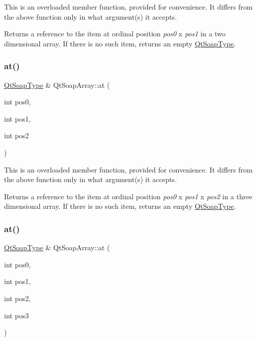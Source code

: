 This is an overloaded member function, provided for convenience. It differs from the above function only in what argument(s) it accepts.

Returns a reference to the item at ordinal position {\itshape pos0} x {\itshape pos1} in a two dimensional array. If there is no such item, returns an empty \mbox{\hyperlink{class_qt_soap_type}{Qt\+Soap\+Type}}. \mbox{\label{class_qt_soap_array_a773a47f952fd917c581740874f6e8c01}} 
\subsubsection{\texorpdfstring{at()}{at()}\hspace{0.1cm}{\footnotesize\ttfamily [3/10]}}
{\footnotesize\ttfamily \mbox{\hyperlink{class_qt_soap_type}{Qt\+Soap\+Type}} \& Qt\+Soap\+Array\+::at (\begin{DoxyParamCaption}\item[{int}]{pos0,  }\item[{int}]{pos1,  }\item[{int}]{pos2 }\end{DoxyParamCaption})}

This is an overloaded member function, provided for convenience. It differs from the above function only in what argument(s) it accepts.

Returns a reference to the item at ordinal position {\itshape pos0} x {\itshape pos1} x {\itshape pos2} in a three dimensional array. If there is no such item, returns an empty \mbox{\hyperlink{class_qt_soap_type}{Qt\+Soap\+Type}}. \mbox{\label{class_qt_soap_array_a3d9b7e09e7c7fdac354b5d8f11a51daa}} 
\subsubsection{\texorpdfstring{at()}{at()}\hspace{0.1cm}{\footnotesize\ttfamily [4/10]}}
{\footnotesize\ttfamily \mbox{\hyperlink{class_qt_soap_type}{Qt\+Soap\+Type}} \& Qt\+Soap\+Array\+::at (\begin{DoxyParamCaption}\item[{int}]{pos0,  }\item[{int}]{pos1,  }\item[{int}]{pos2,  }\item[{int}]{pos3 }\end{DoxyParamCaption})}

